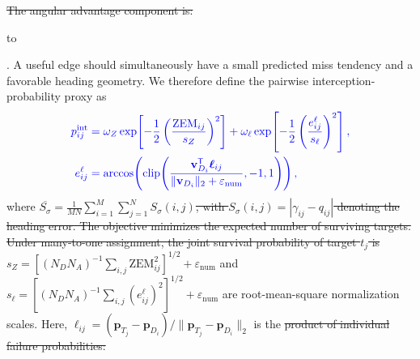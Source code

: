 \documentclass[lettersize,journal]{IEEEtran}
\providecommand{\DIFadd}[1]{{\protect\color{blue}#1}} %
\providecommand{\DIFdel}[1]{{\protect\color{red}\sout{#1}}}                      %
\newcommand{\DIFdelDISPLAY}[1]{%
  \par\addvspace{4pt}%
  \sbox{\DIFDELbox}{$\displaystyle\color{red}\begin{aligned}#1\end{aligned}$}%
  \noindent\hbox to\hsize{\hfil %
    \rlap{\usebox{\DIFDELbox}}%
    \raisebox{\dimexpr(\ht\DIFDELbox-\dp\DIFDELbox)/2\relax}[0pt][0pt]{\textcolor{red}{\rule{\wd\DIFDELbox}{0.6pt}}}%
    \hfil}%
  \par\addvspace{4pt}%
} %
\providecommand{\DIFaddbegin}{} %
\providecommand{\DIFaddend}{} %
\providecommand{\DIFdelbegin}{} %
\providecommand{\DIFdelend}{} %
\newcommand{\DIFscaledelfig}{0.5}
\newlength{\DIFdelgraphicswidth} %
\newlength{\DIFdelgraphicsheight} %
\newcommand{\DIFaddincludegraphics}[2][]{{\color{blue}\fbox{\DIFOincludegraphics[#1]{#2}}}} %
\newcommand{\DIFdelincludegraphics}[2][]{%
\sbox{\DIFdelgraphicsbox}{\DIFOincludegraphics[#1]{#2}}%
\settoboxwidth{\DIFdelgraphicswidth}{\DIFdelgraphicsbox} %
\settoboxtotalheight{\DIFdelgraphicsheight}{\DIFdelgraphicsbox} %
\scalebox{\DIFscaledelfig}{%
\parbox[b]{\DIFdelgraphicswidth}{\usebox{\DIFdelgraphicsbox}\\[-\baselineskip] \rule{\DIFdelgraphicswidth}{0em}}\llap{\resizebox{\DIFdelgraphicswidth}{\DIFdelgraphicsheight}{%
\setlength{\unitlength}{\DIFdelgraphicswidth}%
\begin{picture}(1,1)%
\thicklines\linethickness{2pt} %
{\color[rgb]{1,0,0}\put(0,0){\framebox(1,1){}}}%
{\color[rgb]{1,0,0}\put(0,0){\line( 1,1){1}}}%
{\color[rgb]{1,0,0}\put(0,1){\line(1,-1){1}}}%
\end{picture}%
}\hspace*{3pt}}} %
} %
\DeclareRobustCommand{\DIFaddbegin}{\DIFOaddbegin \let\includegraphics\DIFaddincludegraphics} %
\DeclareRobustCommand{\DIFaddend}{\DIFOaddend \let\includegraphics\DIFOincludegraphics} %
\DeclareRobustCommand{\DIFdelbegin}{\DIFOdelbegin \let\includegraphics\DIFdelincludegraphics} %
\DeclareRobustCommand{\DIFdelend}{\DIFOaddend \let\includegraphics\DIFOincludegraphics} %
\begin{document}
\DIFdel{The angular advantage component is:
}%

\DIFdelDISPLAY{%
P_{\sigma}(i,j) = \exp\left[-\frac{1}{2}\left(\frac{S_{\sigma}(i,j)}{\overline{S_{\sigma}}}\right)^2\right]
}
\DIFdelend \DIFaddbegin \DIFadd{. A useful edge should
simultaneously have a small predicted miss tendency and a favorable heading geometry. We
therefore define the pairwise interception-probability proxy as
}\begin{equation}
\DIFadd{\label{eq:pair_score}
\begin{aligned}
p_{ij}^{\mathrm{int}}
 &= \omega_Z\exp\!\left[-\frac{1}{2}
       \left(\frac{\mathrm{ZEM}_{ij}}{s_Z}\right)^2\right]
  + \omega_{\ell}\exp\!\left[-\frac{1}{2}
       \left(\frac{e_{ij}^{\ell}}{s_{\ell}}\right)^2\right],\\
e_{ij}^{\ell}
 &= \arccos\!\left(\operatorname{clip}\!\left(
 \frac{\mathbf v_{D_i}^{\mathsf T}\boldsymbol\ell_{ij}}{\|\mathbf v_{D_i}\|_2+\varepsilon_{\mathrm{num}}},-1,1\right)\right),
\end{aligned}
}\end{equation}\DIFaddend 
where \DIFdelbegin \DIFdel{$\overline{S_{\sigma}} = \frac{1}{MN}\sum_{i=1}^{M}\sum_{j=1}^{N} S_{\sigma}(i,j)$, with $S_{\sigma}(i,j) = |\gamma_{ij} - q_{ij}|$ denoting the heading error. The objective minimizes the expected number of surviving targets. Under many-to-one assignment, the joint survival probability of target $t_j$ is
}\DIFdelend \DIFaddbegin \DIFadd{$s_Z=[(N_DN_A)^{-1}\sum_{i,j}\mathrm{ZEM}_{ij}^{2}]^{1/2}
+\varepsilon_{\mathrm{num}}$ and
$s_{\ell}=[(N_DN_A)^{-1}\sum_{i,j}(e_{ij}^{\ell})^{2}]^{1/2}
+\varepsilon_{\mathrm{num}}$ are root-mean-square normalization scales. Here,
$\boldsymbol\ell_{ij}=(\mathbf p_{T_j}-\mathbf p_{D_i})/
\|\mathbf p_{T_j}-\mathbf p_{D_i}\|_2$ is }\DIFaddend the \DIFdelbegin \DIFdel{product of individual failure probabilities:
}%
\end{document}
